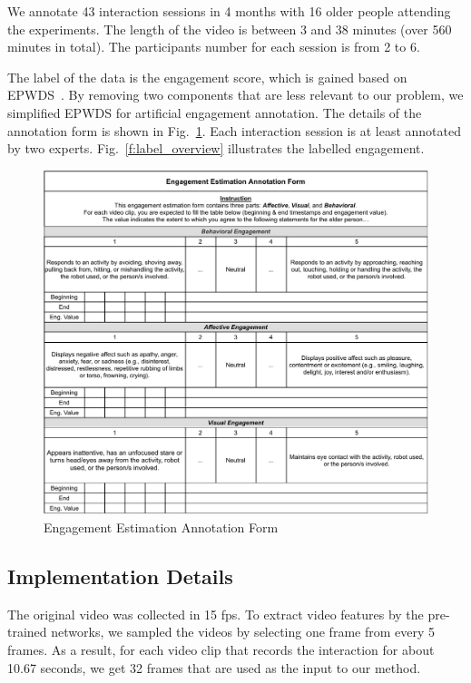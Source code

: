 \documentclass[twocolumn]{svjour3}
\begin{document}
We annotate 43 interaction sessions in 4 months with 16 older people attending the experiments. The length of the video is between 3 and 38 minutes (over 560 minutes in total). The participants number for each session is from 2 to 6. 

The label of the data is the engagement score, which is gained based on  EPWDS~\cite{Jones2018Engagement}. By removing two components that are less relevant to our problem, we simplified EPWDS for artificial engagement annotation. The details of the annotation form is shown in Fig.~\ref{f:annotation_form}. Each interaction session is at least annotated by two experts. Fig.~\ref{f:label_overview} illustrates the labelled engagement.  

\begin{figure}[t]
  \centering
  \includegraphics[width=\linewidth]{assets/annotation_form.drawio}
  \caption{Engagement Estimation Annotation Form}
  \label{f:annotation_form}
\end{figure}




\subsection{Implementation Details}
\label{subs:Implementation_Details}

The original video was collected in 15 fps. To extract video features by the pre-trained networks, we sampled the videos by selecting one frame from every 5 frames. As a result, for each video clip that records the interaction for about 10.67 seconds, we get 32 frames that are used as the input to our method. 
\end{document}
